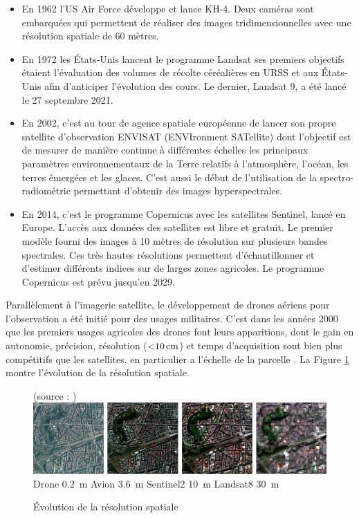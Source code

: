 \documentclass[../thesis.tex]{subfiles}
\begin{document}
    \begin{itemize}[noitemsep]
        \item En 1962 l'US Air Force développe et lance KH-4. Deux caméras sont embarquées qui permettent de réaliser des images tridimensionnelles avec une résolution spatiale de 60 mètres. %
        \item En 1972 les États-Unis lancent le programme Landsat ses premiers objectifs étaient l'évaluation des volumes de récolte céréalières en URSS et aux États-Unis afin d'anticiper l'évolution des cours. Le dernier, Landsat 9, a été lancé le 27 septembre 2021.
        \item En 2002, c'est au tour de agence spatiale européenne de lancer son propre satellite d'observation ENVISAT (ENVIronment SATellite) dont l'objectif est de mesurer de manière continue à différentes échelles les principaux paramètres environnementaux de la Terre relatifs à l'atmosphère, l'océan, les terres émergées et les glaces. C'est aussi le début de l'utilisation de la spectro-radiométrie permettant d'obtenir des images hyperspectrales.
        \item En 2014, c'est le programme Copernicus avec les satellites Sentinel, lancé en Europe. L'accès aux données des satellites est libre et gratuit. Le premier modèle fourni des images à 10 mètres de résolution sur plusieurs bandes spectrales. Ces très hautes résolutions permettent d'échantillonner et d'estimer différents indices sur de larges zones agricoles. Le programme Copernicus est prévu jusqu'en 2029.
    \end{itemize}
    
    Parallèlement à l'imagerie satellite, le développement de drones aériens pour l'observation a été initié pour des usages militaires. C'est dans les années 2000 que les premiers usages agricoles des drones font leurs apparitions, dont le gain en autonomie, précision, résolution ($\SI{<10}{\cm}$) et temps d'acquisition sont bien plus compétitifs que les satellites, en particulier a l'échelle de la parcelle  \cite{lherbier2005valorisation,bossu2007segmentation, Koot891024465110, Pretto2019}. La Figure \ref{fig:02-landsat} montre l'évolution de la résolution spatiale.
    
    \begin{figure}[H]
        \centering
        {\scriptsize (source : \cite{Shunlin20121})} \\
        \includegraphics[width=0.7\linewidth]{img/intro/landsat} \\
        {\scriptsize Drone \SI{0.2}{\meter} \hspace{1.2cm} Avion \SI{3.6}{\meter} \hspace{1cm} Sentinel2 \SI{10}{\meter} \hspace{1cm} Landsat8 \SI{30}{\meter}}
        \caption{Évolution de la résolution spatiale}
        \label{fig:02-landsat}
    \end{figure}
    
\end{document}
